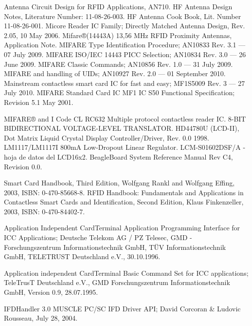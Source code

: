 \begin{thebibliography}{200}

 Antenna Circuit Design for RFID Applications, AN710.
 HF Antenna Design Notes, Literature Number: 11-08-26-003.
 HF Antenna Cook Book, Lit. Number 11-08-26-001.
 Micore Reader IC Family; Directly Matched Antenna Design, Rev. 2.05, 10 May 2006.
 Mifare®(14443A) 13,56 MHz RFID Proximity Antennas, Application Note.
\bibitem{} MIFARE Type Identification Procedure; AN10833 Rev. 3.1 — 07 July 2009.
\bibitem{} MIFARE ISO/IEC 14443 PICC Selection; AN10834 Rev. 3.0 — 26 June 2009.
\bibitem{} MIFARE Classic Commands; AN10856 Rev. 1.0 — 31 July 2009.
\bibitem{} MIFARE and handling of UIDs; AN10927 Rev. 2.0 — 01 September 2010.
\bibitem{} Mainstream contactless smart card IC for fast and easy; MF1S5009 Rev. 3 — 27 July 2010.
\bibitem{} MIFARE Standard Card IC MF1 IC S50 Functional Specification; Revision 5.1 May 2001.

 MIFARE® and I Code CL RC632 Multiple protocol contactless reader IC.
 8-BIT BIDIRECTIONAL VOLTAGE-LEVEL TRANSLATOR.
 HD44780U (LCD-II), Dot Matrix Liquid Crystal Display Controller/Driver, Rev. 0.0 1998. 
 LM1117/LM1117I 800mA Low-Dropout Linear Regulator.
 LCM-S01602DSF/A - hoja de datos del LCD16x2.
 BeagleBoard System Reference Manual Rev C4, Revision 0.0.

 Smart Card Handbook, Third Edition, Wolfgang Rankl and Wolfgang Effing, 2003, ISBN: 0-470-85668-8. 
 RFID Handbook: Fundamentals and Applications in Contactless Smart Cards and Identification,
Second Edition, Klaus Finkenzeller, 2003, ISBN: 0-470-84402-7. 

 Application Independent CardTerminal Application Programming Interface for ICC Applications; 
Deutsche Telekom AG / PZ Telesec, GMD - Forschungszentrum Informationstechnik GmbH, TÜV Informationstechnik GmbH, TELETRUST Deutschland e.V., 30.10.1996.

 Application independent CardTerminal Basic Command Set for ICC applications; 
TeleTrusT Deutschland e.V., GMD Forschungszentrum Informationstechnik GmbH, Version 0.9, 28.07.1995.


 IFDHandler 3.0 MUSCLE PC/SC IFD Driver API; David Corcoran \& Ludovic Rousseau, July 28, 2004.



\end{thebibliography}
